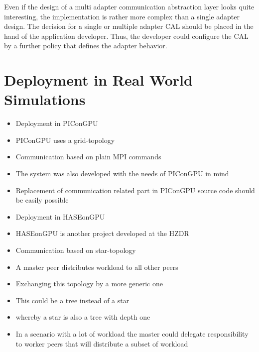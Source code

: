 

Even if the design of a multi adapter communication abstraction layer
looks quite interesting, the implementation is rather more complex
than a single adapter design. The decision for a single or multiple
adapter CAL should be placed in the hand of the application developer.
Thus, the developer could configure the CAL by a further policy that
defines the adapter behavior.


\section*{Deployment in Real World Simulations}
\begin{itemize}

\item Deployment in PIConGPU
\item PIConGPU uses a grid-topology
\item Communication based on plain MPI commands
\item The system was also developed with the needs
  of PIConGPU in mind
\item Replacement of communication related part
  in PIConGPU source code should be easily possible

\item Deployment in HASEonGPU
\item HASEonGPU is another project developed at the HZDR
\item Communication based on star-topology
\item A master peer distributes workload to all other peers
\item Exchanging this topology by a more generic one
\item This could be a tree instead of a star
\item whereby a star is also a tree with depth one
\item In a scenario with a lot of workload the master
  could delegate responsibility to worker peers that
  will distribute a subset of workload
\end{itemize}

